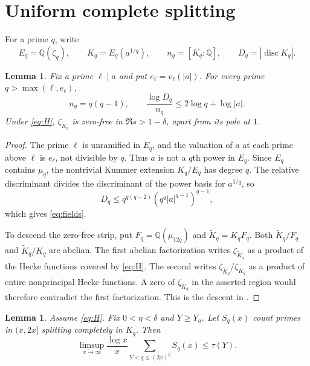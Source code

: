 \documentclass[11pt]{article}
\newtheorem{lemma}[theorem]{Lemma}
\theoremstyle{remark}
\newcommand{\1}{\mathbf 1}
\newcommand{\Q}{\mathbb Q}
\DeclareMathOperator{\disc}{disc}
\begin{document}
\section{Uniform complete splitting}\label{sec:splitting}

For a prime $q$, write
\[
 E_q=\Q(\zeta_q),\qquad K_q=E_q(a^{1/q}),\qquad
 n_q=[K_q:\Q],\qquad D_q=|\disc K_q|.
\]

\begin{lemma}\label{lem:fields}
Fix a prime $\ell\mid a$ and put $e_\ell=v_\ell(|a|)$.
For every prime $q>\max(\ell,e_\ell)$,
\begin{equation}\label{eq:fields}
 n_q=q(q-1),\qquad
 \frac{\log D_q}{n_q}\le2\log q+\log|a|.
\end{equation}
Under \eqref{eq:H}, $\zeta_{K_q}$ is zero-free in
$\Re s>1-\delta$, apart from its pole at $1$.
\end{lemma}

\begin{proof}
The prime $\ell$ is unramified in $E_q$, and the valuation of $a$
at each prime above $\ell$ is $e_\ell$, not divisible by $q$.
Thus $a$ is not a $q$th power in $E_q$.  Since $E_q$ contains
$\mu_q$, the nontrivial Kummer extension $K_q/E_q$ has degree $q$.
The relative discriminant divides the discriminant of the power
basis for $a^{1/q}$, so
\[
 D_q\le q^{q(q-2)}(q^q|a|^{q-1})^{q-1},
\]
which gives \eqref{eq:fields}.

To descend the zero-free strip, put
$F_q=\Q(\mu_{12q})$ and $\widetilde K_q=K_qF_q$.
Both $\widetilde K_q/F_q$ and $\widetilde K_q/K_q$ are abelian.
The first abelian factorization writes $\zeta_{\widetilde K_q}$
as a product of the Hecke functions covered by \eqref{eq:H}.
The second writes $\zeta_{\widetilde K_q}/\zeta_{K_q}$ as a
product of entire nonprincipal Hecke functions.  A zero of
$\zeta_{K_q}$ in the asserted region would therefore contradict
the first factorization.  This is the descent in
\cite[Lemma~9.1]{OAI}.
\end{proof}

\begin{lemma}\label{lem:split-sum}
Assume \eqref{eq:H}.  Fix $0<\eta<\delta$ and $Y\ge Y_a$.
Let $S_q(x)$ count primes in $(x,2x]$ splitting completely in
$K_q$.  Then
\begin{equation}\label{eq:split-sum}
 \limsup_{x\to\infty}\frac{\log x}{x}
       \sum_{Y<q\le(2x)^\eta}S_q(x)\le\tau(Y).
\end{equation}
\end{lemma}
\end{document}
